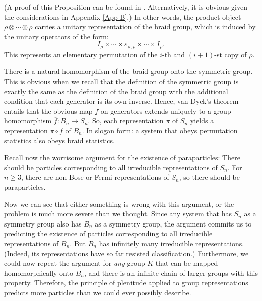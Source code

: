 \documentclass[11pt]{article}
\theoremstyle{definition}
\theoremstyle{definition}
\theoremstyle{remark}
\newcommand{\ve}{\varepsilon}
\def\ol#1{{\overline #1}}
\begin{document}
(A proof of this Proposition can be found in \cite{rehr}.
Alternatively, it is obvious given the considerations in Appendix
\ref{App-B}.)  In other words, the product object $\rho \otimes \cdots
\otimes \rho$ carries a unitary representation of the braid group,
which is induced by the unitary operators of the form:
$$I_\rho \times \cdots \times \ve _{\rho ,\rho} \times \cdots
\times I_\rho .$$ This represents an elementary permutation of the
$i$-th and $(i+1)$-st copy of $\rho$.

There is a natural homomorphism of the braid group onto the symmetric
group.  This is obvious when we recall that the definition of the
symmetric group is exactly the same as the definition of the braid
group with the additional condition that each generator is its own
inverse.  Hence, van Dyck's theorem \cite[p.\ 78]{hung} entails that
the obvious map $f$ on generators extends uniquely to a group
homomorphism $\ol f:B_n\to S_n$.  So, each representation $\pi$ of
$S_n$ yields a representation $\pi \circ \ol f$ of $B_n$. In slogan
form: a system that obeys permutation statistics also obeys braid
statistics.

Recall now the worrisome argument for the existence of paraparticles: 
There should be particles corresponding to all irreducible
representations of $S_n$.  For $n\geq 3$, there are non Bose or Fermi
representations of $S_n$, so there should be paraparticles.  

Now we can see that either something is wrong with this
argument, or the problem is much more severe than we
thought.  Since any system that has $S_n$ as a symmetry
group also has $B_n$ as a symmetry group, the argument
commits us to predicting the existence of particles
corresponding to all irreducible representations of
$B_n$.  But $B_n$ has infinitely many irreducible
representations.  (Indeed, its representations have so
far resisted classification.)  Furthermore, we could
now repeat the argument for \emph{any} group $K$ that
can be mapped homomorphically onto $B_n$, and there is
an infinite chain of larger groups with this property.
Therefore, the principle of plenitude applied to group
representations predicts more particles than we could
ever possibly describe.

\bigskip {}


 {\small  }
\end{document}
